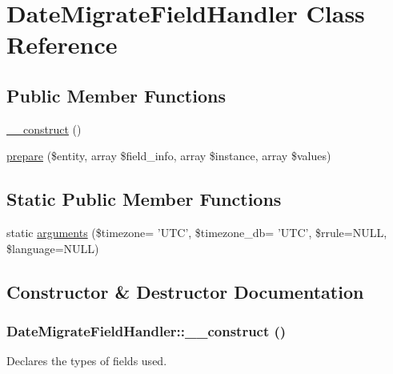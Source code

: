 \hypertarget{classDateMigrateFieldHandler}{
\section{DateMigrateFieldHandler Class Reference}
\label{classDateMigrateFieldHandler}
}
\subsection*{Public Member Functions}
\begin{DoxyCompactItemize}
\item 
\hyperlink{classDateMigrateFieldHandler_a4c93408bd8ea11586845a70b2e46ff68}{\_\-\_\-construct} ()
\item 
\hyperlink{classDateMigrateFieldHandler_a25dc6470976ed92a402d367d5ebe6e94}{prepare} (\$entity, array \$field\_\-info, array \$instance, array \$values)
\end{DoxyCompactItemize}
\subsection*{Static Public Member Functions}
\begin{DoxyCompactItemize}
\item 
static \hyperlink{classDateMigrateFieldHandler_a31f621fdb7e93f06530d8fb1ee2934ae}{arguments} (\$timezone= 'UTC', \$timezone\_\-db= 'UTC', \$rrule=NULL, \$language=NULL)
\end{DoxyCompactItemize}


\subsection{Constructor \& Destructor Documentation}
\hypertarget{classDateMigrateFieldHandler_a4c93408bd8ea11586845a70b2e46ff68}{
\subsubsection[{\_\-\_\-construct}]{\setlength{\rightskip}{0pt plus 5cm}DateMigrateFieldHandler::\_\-\_\-construct ()}}
\label{classDateMigrateFieldHandler_a4c93408bd8ea11586845a70b2e46ff68}
Declares the types of fields used. 

